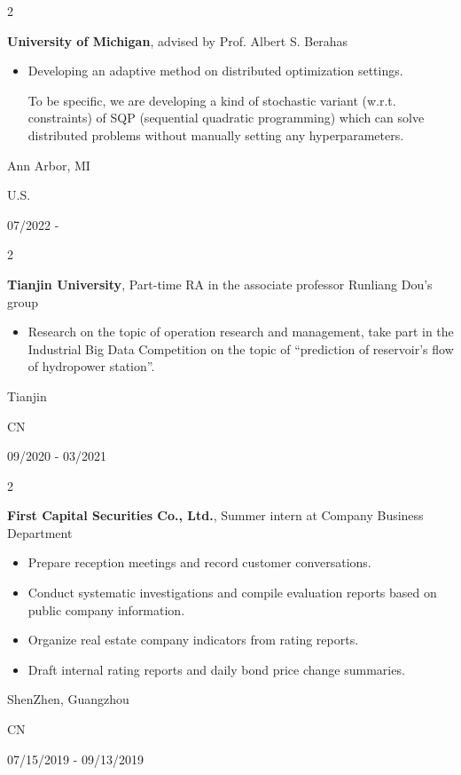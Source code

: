 \documentclass[10pt, letterpaper]{article}
\newenvironment{highlights}{
    \begin{itemize}[
        topsep=0.10 cm,
        parsep=0.10 cm,
        partopsep=0pt,
        itemsep=0pt,
        leftmargin=0.4 cm + 10pt
    ]
}{
    \end{itemize}
} %
\newenvironment{twocolentry}[2][]{
    \onecolentry
    \def\secondColumn{#2}
    \setcolumnwidth{\fill, 4.5 cm}
    \begin{paracol}{2}
}{
    \switchcolumn \raggedleft \secondColumn
    \end{paracol}
    \endonecolentry
} %
\begin{document}
        \vspace{0.2 cm}

        \begin{twocolentry}{
            Ann Arbor, MI

            U.S.

            07/2022 -
        }
            \textbf{University of Michigan}, advised by Prof. Albert S. Berahas
            \begin{highlights}
                \item Developing an adaptive method on distributed optimization settings. 
                
                To be specific, we are
                developing a kind of stochastic variant (w.r.t. constraints) of SQP (sequential quadratic programming)
                which can solve distributed problems without manually setting any hyperparameters.
            \end{highlights}
        \end{twocolentry}

        \begin{twocolentry}{
            Tianjin

            CN

            09/2020 - 03/2021
        }
            \textbf{Tianjin University}, Part-time RA in the associate professor Runliang Dou's group
            \begin{highlights}
                \item Research on the topic of operation research and management, take part in the Industrial Big
                Data Competition on the topic of “prediction of reservoir’s flow of hydropower station”.
            \end{highlights}
        \end{twocolentry}

        \begin{twocolentry}{
            ShenZhen, Guangzhou

            CN

            07/15/2019 - 09/13/2019
        }
            \textbf{First Capital Securities Co., Ltd.}, Summer intern at Company Business Department
            \begin{highlights}
                \item Prepare reception meetings and record customer conversations.
                \item Conduct systematic investigations and compile evaluation reports based on public company information.
                \item Organize real estate company indicators from rating reports.
                \item Draft internal rating reports and daily bond price change summaries.
            \end{highlights}
        \end{twocolentry}
\end{document}
